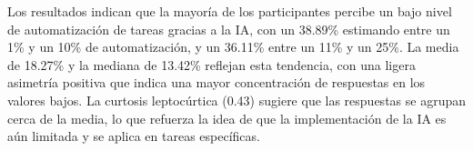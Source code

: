 
Los resultados indican que la mayoría de los participantes percibe un bajo nivel de automatización de tareas gracias a la IA, con un 38.89\% estimando entre un 1\% y un 10\% de automatización, y un 36.11\% entre un 11\% y un 25\%. La media de 18.27\% y la mediana de 13.42\% reflejan esta tendencia, con una ligera asimetría positiva que indica una mayor concentración de respuestas en los valores bajos. La curtosis leptocúrtica (0.43) sugiere que las respuestas se agrupan cerca de la media, lo que refuerza la idea de que la implementación de la IA es aún limitada y se aplica en tareas específicas.
